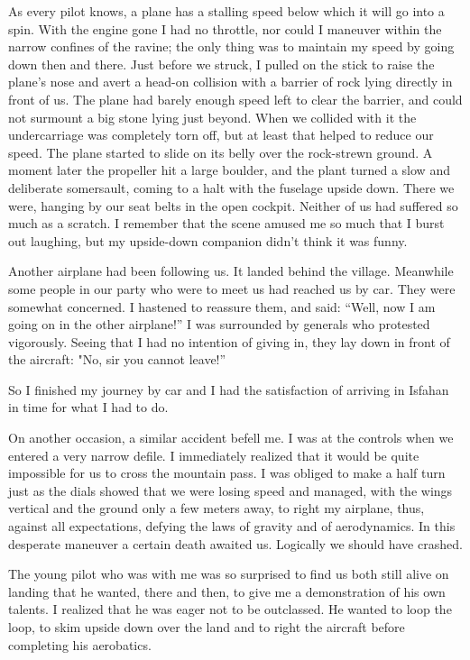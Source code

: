 As every pilot knows, a plane has a stalling speed below which it will go into a spin. With the engine gone I had no throttle, nor could I maneuver within the narrow confines of the ravine; the only thing was to maintain my speed by going down then and there. Just before we struck, I pulled on the stick to raise the plane's nose and avert a head-on collision with a barrier of rock lying directly in front of us. The plane had barely enough speed left to clear the barrier, and could not surmount a big stone lying just beyond. When we collided with it the undercarriage was completely torn off, but at least that helped to reduce our speed. The plane started to slide on its belly over the rock-strewn ground. A moment later the propeller hit a large boulder, and the plant turned a slow and deliberate somersault, coming to a halt with the fuselage upside down. There we were, hanging by our seat belts in the open cockpit. Neither of us had suffered so much as a scratch. I remember that the scene amused me so much that I burst out laughing, but my upside-down companion didn’t think it was funny. 

Another airplane had been following us. It landed behind the village. Meanwhile some people in our party who were to meet us had reached us by car. They were somewhat concerned. I hastened to reassure them, and said: “Well, now I am going on in the other airplane!” I was surrounded by generals who protested vigorously. Seeing that I had no intention of giving in, they lay down in front of the aircraft: "No, sir you cannot leave!” 

So I finished my journey by car and I had the satisfaction of arriving in Isfahan in time for what I had to do. 

On another occasion, a similar accident befell me. I was at the controls when we entered a very narrow defile. I immediately realized that it would be quite impossible for us to cross the mountain pass. I was obliged to make a half turn just as the dials showed that we were losing speed and managed, with the wings vertical and the ground only a few meters away, to right my airplane, thus, against all expectations, defying the laws of gravity and of aerodynamics. In this desperate maneuver a certain death awaited us. Logically we should have crashed. 

The young pilot who was with me was so surprised to find us both still alive on landing that he wanted, there and then, to give me a demonstration of his own talents. I realized that he was eager not to be outclassed. He wanted to loop the loop, to skim upside down over the land and to right the aircraft before completing his aerobatics. 

